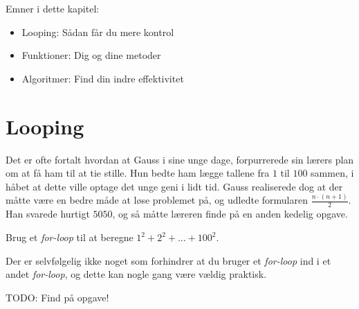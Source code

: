 	Emner i dette kapitel:

	\begin{itemize} %
		\item Looping: Sådan får du mere kontrol
		\item Funktioner: Dig og dine metoder
		\item Algoritmer: Find din indre effektivitet
	\end{itemize}

\section{Looping}




	\begin{exercise}
		Det er ofte fortalt hvordan at Gauss i sine unge dage, forpurrerede sin
		lærers plan om at få ham til at tie stille. Hun bedte ham lægge tallene
		fra \(1\) til \(100\) sammen, i håbet at dette ville optage det unge
		geni i lidt tid. Gauss realiserede dog at der måtte være en bedre måde
		at løse problemet på, og udledte formularen \(\frac{n\cdot(n+1)}{2}\).
		Han svarede hurtigt \(5050\), og så måtte læreren finde på en anden
		kedelig opgave.

		Brug et \emph{for-loop} til at beregne \(1^2+2^2+\dots+100^2\).
	\end{exercise}

	\begin{exercise}
		Der er selvfølgelig ikke noget som forhindrer at du bruger et
		\emph{for-loop} ind i et andet \emph{for-loop}, og dette kan nogle gang
		være vældig praktisk.

		TODO: Find på opgave!
	\end{exercise}


